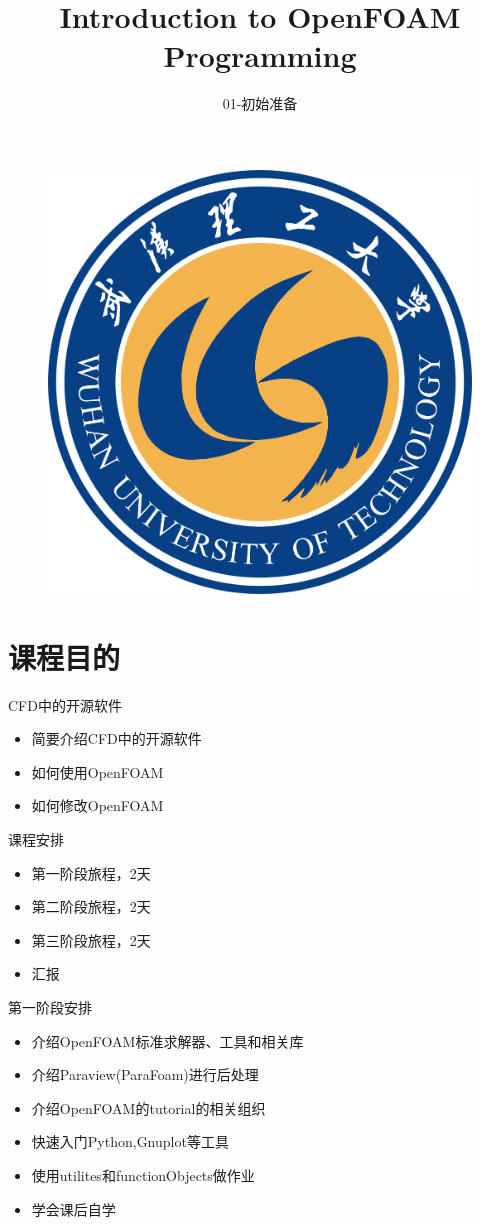 \documentclass{beamer}
\author{\kaishu{汪洋}}
\title{Introduction to OpenFOAM Programming}
\subtitle{01-初始准备}
\institute{\kaishu{武汉理工大学交通学院}}
\date{\kaishu{2020年12月}}
\begin{document}
\kaishu
\begin{frame}
    \titlepage
    \begin{figure}[htpb]
        \begin{center}
            \includegraphics[width=0.15\linewidth]{pic/WUT.png}
        \end{center}
    \end{figure}
\end{frame}

\begin{frame}
   \tableofcontents[sectionstyle=show,subsectionstyle=show/shaded/hide,subsubsectionstyle=show/shaded/hide]
\end{frame}

\section{课程目的}

\begin{frame}{CFD中的开源软件}
    \begin{itemize}
        \item 简要介绍CFD中的开源软件
        \item 如何使用OpenFOAM
        \item 如何修改OpenFOAM
    \end{itemize}
\end{frame}

\begin{frame}{课程安排}
    \begin{itemize}
        \item 第一阶段旅程，2天
        \item 第二阶段旅程，2天
        \item 第三阶段旅程，2天
        \item 汇报
    \end{itemize}
\end{frame}

\begin{frame}{第一阶段安排}
    \begin{itemize}
        \item 介绍OpenFOAM标准求解器、工具和相关库
        \item 介绍Paraview(ParaFoam)进行后处理
        \item 介绍OpenFOAM的tutorial的相关组织
        \item 快速入门Python,Gnuplot等工具
        \item 使用utilites和functionObjects做作业
        \item 学会课后自学
    \end{itemize}
    
\end{frame}
\end{document}

